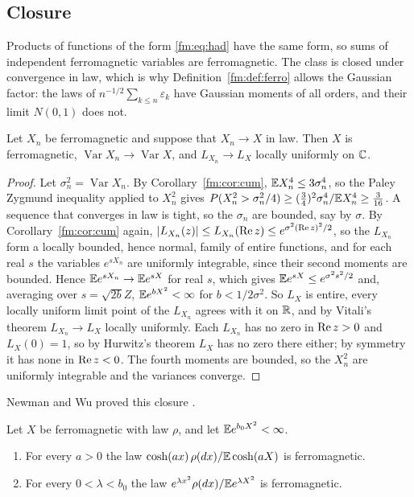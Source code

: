 \subsection{Closure}\label{fm:sec:closure}

Products of functions of the form \eqref{fm:eq:had} have the same form, so sums of independent ferromagnetic variables are ferromagnetic. The class is closed under convergence in law, which is why Definition~\ref{fm:def:ferro} allows the Gaussian factor: the laws of $n^{-1/2}\sum_{k\le n}\varepsilon_k$ have Gaussian moments of all orders, and their limit $N(0,1)$ does not.

\begin{theorem}\label{fm:thm:closed}
Let $X_n$ be ferromagnetic and suppose that $X_n\to X$ in law. Then $X$ is ferromagnetic, $\operatorname{Var}X_n\to\operatorname{Var}X$, and $L_{X_n}\to L_X$ locally uniformly on $\mathbb{C}$.
\end{theorem}

\begin{proof}
Let $\sigma_n^2=\operatorname{Var}X_n$. By Corollary~\ref{fm:cor:cum}, $\mathbb{E} X_n^4\le3\sigma_n^4$, so the Paley Zygmund inequality applied to $X_n^2$ gives $P(X_n^2>\sigma_n^2/4)\ge(\frac34)^2\sigma_n^4/\mathbb{E} X_n^4\ge\frac3{16}$. A sequence that converges in law is tight, so the $\sigma_n$ are bounded, say by $\sigma$. By Corollary~\ref{fm:cor:cum} again, $|L_{X_n}(z)|\le L_{X_n}(\operatorname{Re} z)\le e^{\sigma^2(\operatorname{Re} z)^2/2}$, so the $L_{X_n}$ form a locally bounded, hence normal, family of entire functions, and for each real $s$ the variables $e^{sX_n}$ are uniformly integrable, since their second moments are bounded. Hence $\mathbb{E} e^{sX_n}\to\mathbb{E} e^{sX}$ for real $s$, which gives $\mathbb{E} e^{sX}\le e^{\sigma^2s^2/2}$ and, averaging over $s=\sqrt{2b}Z$, $\mathbb{E} e^{bX^2}<\infty$ for $b<1/2\sigma^2$. So $L_X$ is entire, every locally uniform limit point of the $L_{X_n}$ agrees with it on $\mathbb{R}$, and by Vitali's theorem $L_{X_n}\to L_X$ locally uniformly. Each $L_{X_n}$ has no zero in $\operatorname{Re} z>0$ and $L_X(0)=1$, so by Hurwitz's theorem $L_X$ has no zero there either; by symmetry it has none in $\operatorname{Re} z<0$. The fourth moments are bounded, so the $X_n^2$ are uniformly integrable and the variances converge.
\end{proof}

Newman and Wu proved this closure \cite{NewmanWu19}.

\begin{proposition}\label{fm:prop:tilt}
Let $X$ be ferromagnetic with law $\rho$, and let $\mathbb{E} e^{b_0X^2}<\infty$.
\begin{enumerate}
\item[(i)] For every $a>0$ the law $\cosh(ax)\,\rho(dx)/\mathbb{E}\cosh(aX)$ is ferromagnetic.
\item[(ii)] For every $0<\lambda<b_0$ the law $e^{\lambda x^2}\rho(dx)/\mathbb{E} e^{\lambda X^2}$ is ferromagnetic.
\end{enumerate}
\end{proposition}

